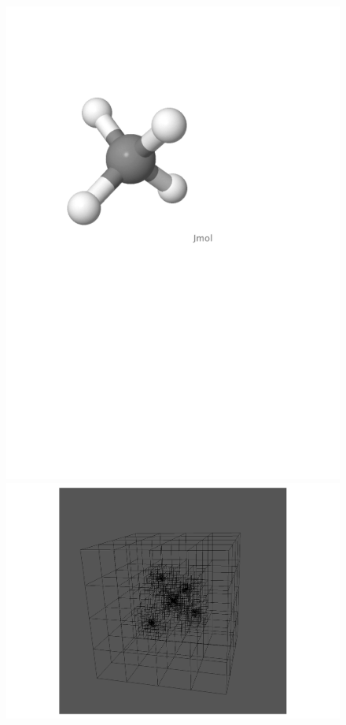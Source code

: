 \begin{frame}
\begin{columns}
    \begin{column}[b]{0.55\textwidth}
    \begin{figure}
        \includegraphics[scale=0.2, clip, viewport = 100 450 400 720]
        {figures/methane.pdf}
        \includegraphics[scale=0.3, clip, viewport = 320 200 520 400]
        {figures/methaneGrid.pdf}
    \end{figure}


\end{column}
\end{columns}
\end{frame}
